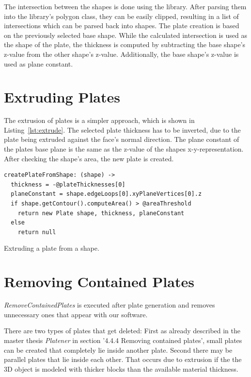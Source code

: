 \documentclass[../ClassicThesis.tex]{subfiles}
\begin{document}
The intersection between the shapes is done using the \jsclipper{} library. After parsing them into the library's polygon class, they can be easily clipped, resulting in a list of intersections which can be parsed back into shapes. The plate creation is based on the previously selected base shape. While the calculated intersection is used as the shape of the plate, the thickness is computed by subtracting the base shape's z-value from the other shape's z-value. Additionally, the base shape's z-value is used as plane constant.

\section{Extruding Plates}\label{sec:extrudedplates}

The extrusion of plates is a simpler approach, which is shown in Listing~\ref{lst:extrude}. The selected plate thickness has to be inverted, due to the plate being extruded against the face's normal direction. The plane constant of the plates base plane is the same as the z-value of the shapes x-y-representation. After checking the shape's area, the new plate is created.

\begin{listing}
\begin{verbatim}
createPlateFromShape: (shape) ->
  thickness = -@plateThicknesses[0]
  planeConstant = shape.edgeLoops[0].xyPlaneVertices[0].z
  if shape.getContour().computeArea() > @areaThreshold
    return new Plate shape, thickness, planeConstant
  else
    return null
\end{verbatim}
\caption{Extruding a plate from a shape.}
\label{lst:extrude}
\end{listing}




\section{Removing Contained Plates}\label{sec:removingContainedPlates}

\emph{RemoveContainedPlates} is executed after plate generation and removes unnecessary ones that appear with our software.

There are two types of plates that get deleted: First as already described in the master thesis \emph{Platener} \cite{master-thesis} in section '4.4.4 Removing contained plates', small plates can be created that completely lie inside another plate. Second there may be parallel plates that lie inside each other. That occurs due to extrusion if the the 3D object is modeled with thicker blocks than the available material thickness.
\end{document}
